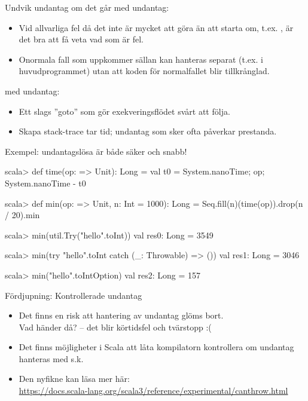 \begin{Slide}{Undvik undantag om det går}
\SlideFontSmall
{} med undantag: 
\begin{itemize}
\item Vid allvarliga fel då det inte är mycket att göra än att starta om, t.ex. , är det bra att få veta vad som är fel.
\item Onormala fall som uppkommer sällan kan hanteras separat (t.ex. i huvudprogrammet) utan att koden för normalfallet blir tillkrånglad. 
\end{itemize}
 med undantag: 
\begin{itemize}
\item Ett slags ''goto'' som gör exekveringsflödet svårt att följa.
\item Skapa stack-trace tar tid; undantag som sker ofta påverkar prestanda.
\end{itemize}
\pause Exempel: undantagslösa  är både säker och snabb!
\begin{REPLsmall}
scala> def time(op: => Unit): Long = {val t0 = System.nanoTime; op; System.nanoTime - t0}

scala> def min(op: => Unit, n: Int = 1000): Long = Seq.fill(n)(time(op)).drop(n / 20).min

scala> min(util.Try("hello".toInt))
val res0: Long = 3549

scala> min(try "hello".toInt catch (_: Throwable) => ())
val res1: Long = 3046

scala> min("hello".toIntOption)
val res2: Long = 157
\end{REPLsmall}
\end{Slide}

\begin{Slide}{Fördjupning: Kontrollerade undantag}
\begin{itemize}
\item Det finns en risk att hantering av undantag glöms bort.\\Vad händer då?  -- det blir körtidsfel och tvärstopp :(
\item Det finns möjligheter i Scala att låta kompilatorn kontrollera om undantag hanteras med s.k.  
\item Den nyfikne kan läsa mer här: \\ \url{https://docs.scala-lang.org/scala3/reference/experimental/canthrow.html}
\end{itemize}
  
\end{Slide}
